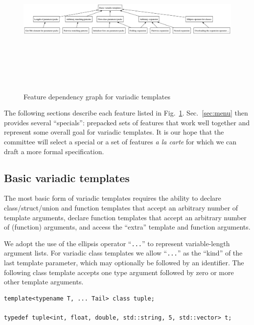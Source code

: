 \documentclass{article}
\begin{document}
\begin{figure}
\center
\includegraphics[width=6in,height=3in]{vt_deps}
\caption{Feature dependency graph for variadic templates}
\label{fig:dependencies}
\end{figure}

The following sections describe each feature listed in
Fig.~\ref{fig:dependencies}. Sec.~\ref{sec:menu} then provides several
``specials'': prepacked sets of features that work well together and
represent some overall goal for variadic templates. It is our hope
that the committee will select a special or a set of features
\textit{a la carte} for which we can draft a more formal
specification. 

\subsection{Basic variadic templates}
\label{sec:basic}
The most basic form of variadic templates requires the ability to
declare class/struct/union and function templates that accept an
arbitrary number of template arguments, declare function templates
that accept an arbitrary number of (function) arguments, and access
the ``extra'' template and function arguments.

We adopt the use of the ellipsis operator ``\texttt{...}'' to
represent variable-length argument lists. For variadic class templates
we allow ``\texttt{...}'' as the ``kind'' of the last template
parameter, which may optionally be followed by an identifier. The
following class template accepts one type argument followed by zero or
more other template arguments.

\begin{verbatim}
template<typename T, ... Tail> class tuple;

typedef tuple<int, float, double, std::string, 5, std::vector> t;
\end{verbatim}
\end{document}
